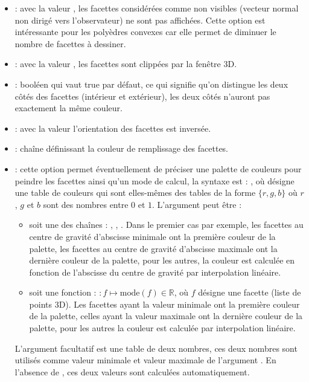 \begin{enumerate}
\begin{itemize}
        \item {} : avec la valeur \true, les facettes considérées comme non visibles (vecteur normal non dirigé vers l'observateur) ne sont pas affichées. Cette option est intéressante pour les polyèdres convexes car elle permet de diminuer le nombre de facettes à dessiner.
        
        \item {} : avec la valeur \true, les facettes sont clippées par la fenêtre 3D.
        
        \item {} : booléen qui vaut true par défaut, ce qui signifie qu'on distingue les deux côtés des facettes (intérieur et extérieur), les deux côtés n'auront pas exactement la même couleur.
        
        \item {} : avec la valeur \true l'orientation des facettes est inversée.
        
        \item {} : chaîne définissant la couleur de remplissage des facettes.
        
        \item {} : cette option permet éventuellement de préciser une palette de couleurs pour peindre les facettes ainsi qu'un mode de calcul, la syntaxe est : , où  désigne une table de couleurs qui sont elles-mêmes des tables de la forme $\{r,g,b\}$ où $r$, $g$ et $b$ sont des nombres entre $0$ et $1$. L'argument   peut être :
            \begin{itemize}
                \item soit une des chaînes : , , . Dans le premier cas par exemple, les facettes au centre de gravité d'abscisse minimale ont la première couleur de la palette, les facettes au centre de gravité d'abscisse maximale ont la dernière couleur de la palette, pour les autres, la couleur est calculée en fonction de l'abscisse du centre de gravité par interpolation linéaire.
                
                \item soit une fonction : $\colon f \mapsto \mathrm{mode}(f)\in\mathbb R$, où $f$ désigne une facette (liste de points 3D). Les facettes ayant la valeur minimale ont la première couleur de la palette, celles ayant la valeur maximale ont la dernière couleur de la palette, pour les autres la couleur est calculée par interpolation linéaire.
            \end{itemize}  
        L'argument facultatif  est une table de deux nombres, ces deux nombres sont utilisés comme valeur minimale et valeur maximale de l'argument . En l'absence de , ces deux valeurs sont calculées automatiquement.
        \end{itemize}
    

\end{enumerate}
